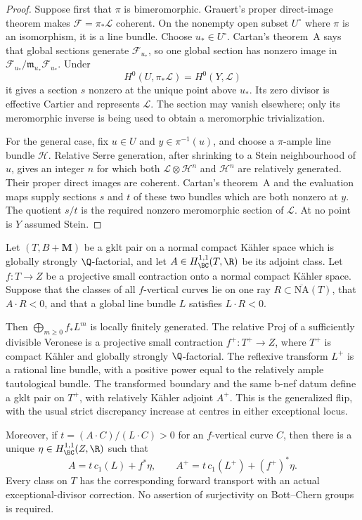 \begin{proof}
Suppose first that $\pi$ is bimeromorphic. Grauert's proper direct-image
theorem makes $\mathcal F=\pi_*\mathcal L$ coherent. On the nonempty
open subset $U^\circ$ where $\pi$ is an isomorphism, it is a line bundle.
Choose $u_*\in U^\circ$. Cartan's theorem~A says that global sections
generate $\mathcal F_{u_*}$, so one global section has nonzero image in
$\mathcal F_{u_*}/\mathfrak m_{u_*}\mathcal F_{u_*}$.
Under
\[
 H^0(U,\pi_*\mathcal L)=H^0(Y,\mathcal L)
\]
it gives a section $s$ nonzero at the unique point above $u_*$.
Its zero divisor is effective Cartier and represents $\mathcal L$.
The section may vanish elsewhere; only its meromorphic inverse is
being used to obtain a meromorphic trivialization.

For the general case, fix $u\in U$ and $y\in\pi^{-1}(u)$, and choose
a $\pi$-ample line bundle $\mathcal H$. Relative Serre generation,
after shrinking to a Stein neighbourhood of $u$, gives an integer
$n$ for which both $\mathcal L\otimes\mathcal H^n$ and
$\mathcal H^n$ are relatively generated. Their proper direct images
are coherent. Cartan's theorem~A and the evaluation maps supply
sections $s$ and $t$ of these two bundles which are both nonzero at
$y$. The quotient $s/t$ is the required nonzero meromorphic section
of $\mathcal L$. At no point is $Y$ assumed Stein.
\end{proof}

\begin{proposition}
\label{prog:detected-flip}
Let $(T,B+\mathbf M)$ be a gklt pair on a normal compact K\"ahler
space which is globally strongly $\Q$-factorial, and let $A\in H^{1,1}_{\BC}(T,\R)$
be its adjoint class. Let $f:T\to Z$ be a projective small contraction
onto a normal compact K\"ahler space. Suppose that the classes of all
$f$-vertical curves lie on one ray $R\subset\overline{\mathrm{NA}}(T)$, that $A\cdot R<0$,
and that a global line bundle $L$ satisfies $L\cdot R<0$.

Then $\bigoplus_{m\geq0}f_*L^m$ is locally finitely generated. The
relative Proj of a sufficiently divisible Veronese is a projective
small contraction $f^+:T^+\to Z$, where $T^+$ is compact K\"ahler and
globally strongly $\Q$-factorial. The reflexive transform $L^+$ is a
rational line bundle, with a positive power equal to the relatively
ample tautological bundle. The transformed boundary and the same
b-nef datum define a gklt pair on $T^+$, with relatively K\"ahler
adjoint $A^+$. This is the generalized flip, with the usual
strict discrepancy increase at centres in either exceptional locus.

Moreover, if $t=(A\cdot C)/(L\cdot C)>0$ for an $f$-vertical curve $C$,
then there is a unique $\eta\in H^{1,1}_{\BC}(Z,\R)$ such that
\[
 A=t\,c_1(L)+f^*\eta,\qquad
 A^+=t\,c_1(L^+)+(f^+)^*\eta.
\]
Every class on $T$ has the corresponding forward transport with an
actual exceptional-divisor correction. No assertion of surjectivity
on Bott--Chern groups is required.
\end{proposition}

